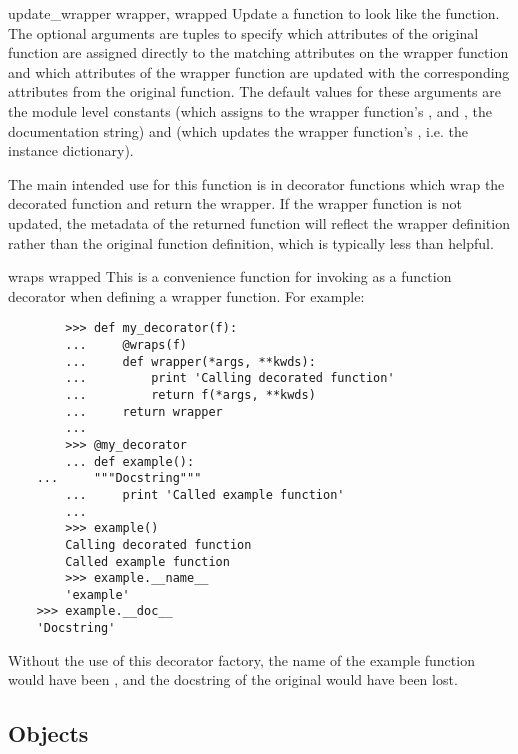 \begin{funcdesc}{update_wrapper}
{wrapper, wrapped}
Update a  function to look like the  function.
The optional arguments are tuples to specify which attributes of the original
function are assigned directly to the matching attributes on the wrapper
function and which attributes of the wrapper function are updated with
the corresponding attributes from the original function. The default
values for these arguments are the module level constants
 (which assigns to the wrapper function's
,  and , the documentation string)
and  (which updates the wrapper function's ,
i.e. the instance dictionary).

The main intended use for this function is in decorator functions
which wrap the decorated function and return the wrapper. If the
wrapper function is not updated, the metadata of the returned function
will reflect the wrapper definition rather than the original function
definition, which is typically less than helpful.
\end{funcdesc}

\begin{funcdesc}{wraps}
{wrapped}
This is a convenience function for invoking
as a function decorator when defining a wrapper function. For example:
  \begin{verbatim}
        >>> def my_decorator(f):
        ...     @wraps(f)
        ...     def wrapper(*args, **kwds):
        ...         print 'Calling decorated function'
        ...         return f(*args, **kwds)
        ...     return wrapper
        ...
        >>> @my_decorator
        ... def example():
	...     """Docstring"""
        ...     print 'Called example function'
        ...
        >>> example()
        Calling decorated function
        Called example function
        >>> example.__name__
        'example'
	>>> example.__doc__
	'Docstring'
  \end{verbatim}
Without the use of this decorator factory, the name of the example
function would have been , and the docstring of the
original  would have been lost.
\end{funcdesc}


\subsection{ Objects \label{partial-objects}}



